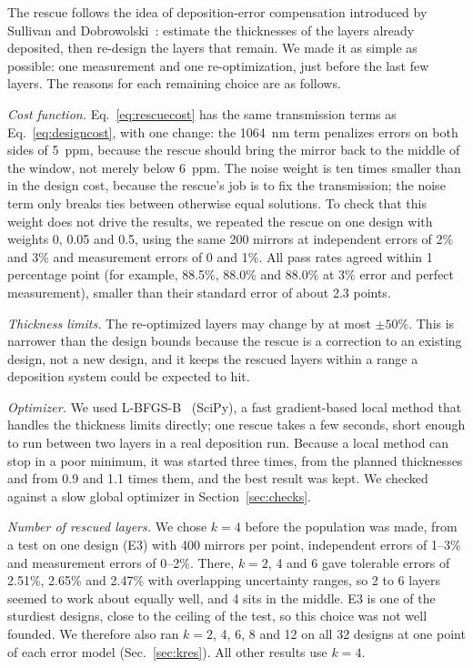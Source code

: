 The rescue follows the idea of deposition-error compensation introduced by Sullivan and Dobrowolski~\cite{Sullivan1992}: estimate the thicknesses of the layers already deposited, then re-design the layers that remain. We made it as simple as possible: one measurement and one re-optimization, just before the last few layers. The reasons for each remaining choice are as follows.

\emph{Cost function.} Eq.~\eqref{eq:rescuecost} has the same transmission terms as Eq.~\eqref{eq:designcost}, with one change: the 1064~nm term penalizes errors on both sides of 5~ppm, because the rescue should bring the mirror back to the middle of the window, not merely below 6~ppm. The noise weight is ten times smaller than in the design cost, because the rescue's job is to fix the transmission; the noise term only breaks ties between otherwise equal solutions. To check that this weight does not drive the results, we repeated the rescue on one design with weights 0, 0.05 and 0.5, using the same 200 mirrors at independent errors of 2\% and 3\% and measurement errors of 0 and 1\%. All pass rates agreed within 1 percentage point (for example, 88.5\%, 88.0\% and 88.0\% at 3\% error and perfect measurement), smaller than their standard error of about 2.3 points.

\emph{Thickness limits.} The re-optimized layers may change by at most $\pm50\%$. This is narrower than the design bounds because the rescue is a correction to an existing design, not a new design, and it keeps the rescued layers within a range a deposition system could be expected to hit.

\emph{Optimizer.} We used L-BFGS-B~\cite{Byrd1995} (SciPy), a fast gradient-based local method that handles the thickness limits directly; one rescue takes a few seconds, short enough to run between two layers in a real deposition run. Because a local method can stop in a poor minimum, it was started three times, from the planned thicknesses and from 0.9 and 1.1 times them, and the best result was kept. We checked against a slow global optimizer in Section~\ref{sec:checks}.

\emph{Number of rescued layers.} We chose $k=4$ before the population was made, from a test on one design (E3) with 400 mirrors per point, independent errors of 1--3\% and measurement errors of 0--2\%. There, $k = 2$, 4 and 6 gave tolerable errors of 2.51\%, 2.65\% and 2.47\% with overlapping uncertainty ranges, so 2 to 6 layers seemed to work about equally well, and 4 sits in the middle. E3 is one of the sturdiest designs, close to the ceiling of the test, so this choice was not well founded. We therefore also ran $k = 2$, 4, 6, 8 and 12 on all 32 designs at one point of each error model (Sec.~\ref{sec:kres}). All other results use $k = 4$.

